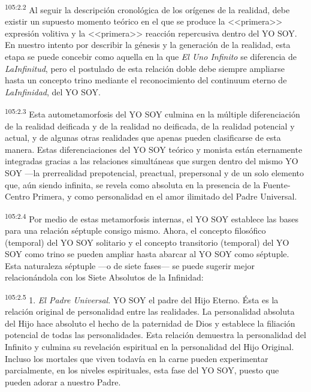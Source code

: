 \documentclass[twoside, 11pt]{book}
\begin{document}
\par
\textsuperscript{105:2.2} Al seguir la descripción cronológica de los orígenes de la realidad, debe existir un supuesto momento teórico en el que se produce la <<primera>> expresión volitiva y la <<primera>> reacción repercusiva dentro del YO SOY. En nuestro intento por describir la génesis y la generación de la realidad, esta etapa se puede concebir como aquella en la que \textit{El Uno Infinito} se diferencia de \textit{LaInfinitud}, pero el postulado de esta relación doble debe siempre ampliarse hasta un concepto trino mediante el reconocimiento del continuum eterno de \textit{LaInfinidad}, del YO SOY.

\par
\textsuperscript{105:2.3} Esta autometamorfosis del YO SOY culmina en la múltiple diferenciación de la realidad deificada y de la realidad no deificada, de la realidad potencial y actual, y de algunas otras realidades que apenas pueden clasificarse de esta manera. Estas diferenciaciones del YO SOY teórico y monista están eternamente integradas gracias a las relaciones simultáneas que surgen dentro del mismo YO SOY ---la prerrealidad prepotencial, preactual, prepersonal y de un solo elemento que, aún siendo infinita, se revela como absoluta en la presencia de la Fuente-Centro Primera, y como personalidad en el amor ilimitado del Padre Universal.

\par
\textsuperscript{105:2.4} Por medio de estas metamorfosis internas, el YO SOY establece las bases para una relación séptuple consigo mismo. Ahora, el concepto filosófico (temporal) del YO SOY solitario y el concepto transitorio (temporal) del YO SOY como trino se pueden ampliar hasta abarcar al YO SOY como séptuple. Esta naturaleza séptuple ---o de siete fases--- se puede sugerir mejor relacionándola con los Siete Absolutos de la Infinidad:

\par
\textsuperscript{105:2.5} 1. \textit{El Padre Universal}. YO SOY el padre del Hijo Eterno. Ésta es la relación original de personalidad entre las realidades. La personalidad absoluta del Hijo hace absoluto el hecho de la paternidad de Dios y establece la filiación potencial de todas las personalidades. Esta relación demuestra la personalidad del Infinito y culmina su revelación espiritual en la personalidad del Hijo Original. Incluso los mortales que viven todavía en la carne pueden experimentar parcialmente, en los niveles espirituales, esta fase del YO SOY, puesto que pueden adorar a nuestro Padre.
\end{document}

